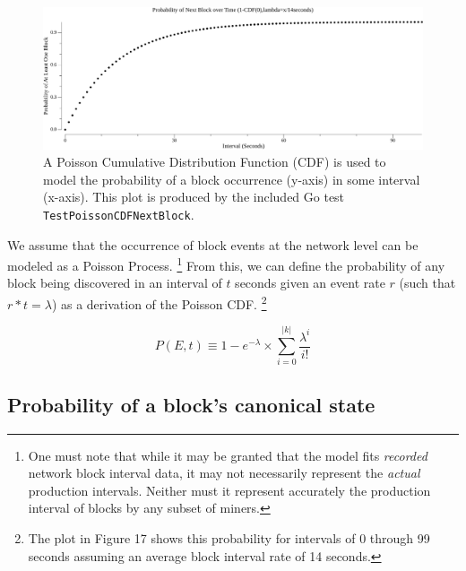 \documentclass[11pt]{article}
\theoremstyle{plain}
\begin{document}
{\begin{figure}[htp]
    \label{go-block-step-cdf-interval}
    \centering
    \includegraphics[width=1.0\textwidth]{go-block-step/out/vis_poisson_cdf_next_in_interval.png}
    \caption{
        A Poisson Cumulative Distribution Function (CDF) is used to model the probability of a block
        occurrence (y-axis) in some interval (x-axis).
        This plot is produced by the included Go test \texttt{TestPoissonCDFNextBlock}.
    }
\end{figure}

We assume that the occurrence of block events at the network level can be
modeled as a Poisson Process.\nolinebreak
\footnote{
One must note that while it may be granted that the model fits \emph{recorded}
network block interval data, it may not necessarily represent the \emph{actual}
production intervals. Neither must it represent accurately the production
interval of blocks by any subset of miners.
}
From this, we can define the probability of any block being discovered in an
interval of $t$ seconds given an event rate $r$ (such that $r * t = \lambda$)
as a derivation of the Poisson CDF.
\footnote{
    The plot in Figure 17 shows this probability for intervals of 0 through 99
    seconds assuming an average block interval rate of 14 seconds.
}

\begin{equation}
P(E,t) \equiv 1 - e^{-\lambda} \times \sum_{i=0}^{|k|}{\frac{\lambda^{i}}{i!}} 
\end{equation}



\subsection{\normalsize{Probability of a block's canonical state}}

}
\end{document}
